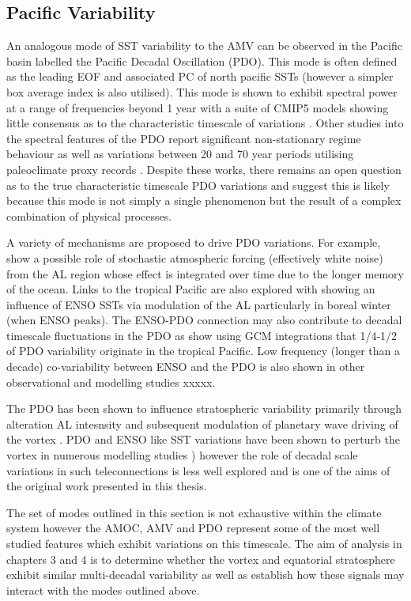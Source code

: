 \subsection{Pacific Variability}
\label{sec:PDO}
An analogous mode of SST variability to the AMV can be observed in the Pacific basin \citep{mantuaPacific1997a,Dong2015} labelled the Pacific Decadal Oscillation (PDO). This mode is often defined as the leading EOF and associated PC of north pacific SSTs (however a simpler box average index is also utilised). This mode is shown to exhibit spectral power at a range of frequencies beyond 1 year with a suite of CMIP5 models showing little consensus as to the characteristic timescale of variations \cite{newmanPacific2016}. Other studies into the spectral features of the PDO report significant non-stationary regime behaviour \cite{overlandRegime2006, flemingNonuniqueness2014} as well as variations between 20 and 70 year periods utilising paleoclimate proxy records \citep{biondiNorth2001}. Despite these works, there remains an open question as to the true characteristic timescale PDO variations and \cite{newmanPacific2016} suggest this is likely because this mode is not simply a single phenomenon but the result of a complex combination of physical processes. 

A variety of mechanisms are proposed to drive PDO variations. For example, \cite{frankignoulStochastic1977} show a possible role of stochastic atmospheric forcing (effectively white noise) from the AL region whose effect is integrated over time due to the longer memory of the ocean. Links to the tropical Pacific are also explored with \cite{strongRole2009} showing an influence of ENSO SSTs via modulation of the AL particularly in boreal winter (when ENSO peaks). The ENSO-PDO connection may also contribute to decadal timescale fluctuations in the PDO as \citep{alexanderAtmospheric2002, alexanderRole2008} show using GCM integrations that 1/4-1/2 of PDO variability originate in the tropical Pacific. Low frequency (longer than a decade) co-variability between ENSO and the PDO is also shown in other observational and modelling studies xxxxx.

The PDO has been shown to influence stratospheric variability primarily through alteration AL intesnsity and subsequent modulation of planetary wave driving of the vortex \citep{krenWintertime2016b,Kang2017,huDecadal2018b}. PDO and ENSO like SST variations have been shown to perturb the vortex in numerous modelling studies \citep{krenWintertime2016b,garcia-herreraPropagation2006b}) however the role of decadal scale variations in such teleconnections is less well explored and is one of the aims of the original work presented in this thesis.

The set of modes outlined in this section is not exhaustive within the climate system however the AMOC, AMV and PDO represent some of the most well studied features which exhibit variations on this timescale. The aim of analysis in chapters 3 and 4 is to determine whether the vortex and equatorial stratosphere exhibit similar multi-decadal variability as well as establish how these signals may interact with the modes outlined above.



